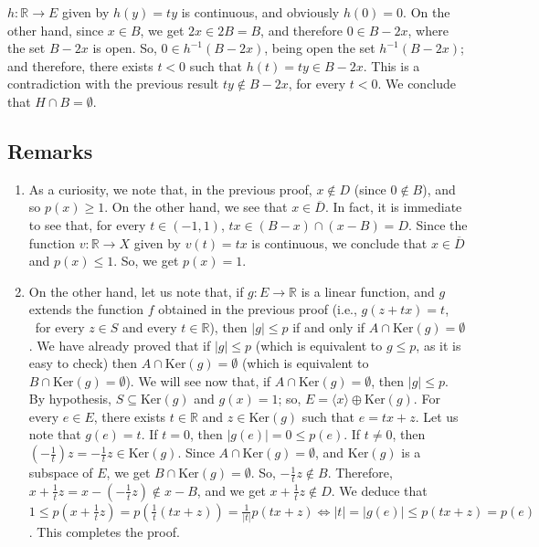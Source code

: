 \documentclass{article}
\begin{document}
$h:\mathbb{R}\rightarrow E$ given by $h(y)=ty$ is continuous, and obviously $h(0)=0$. On the other hand, since $x\in B$, we get $2x\in2B=B$, and therefore $0\in B-2x$, where the set $B-2x$ is open. So, $0\in h^{-1}(B-2x)$, being open the set $h^{-1}(B-2x)$; and therefore, there exists $t<0$ such that $h(t)=ty\in B-2x$. This is a contradiction with the previous result $ty\notin B-2x$, for every $t<0$. We conclude that $H\cap B=\emptyset$.

\subsection{Remarks}

\begin{enumerate}
\item As a curiosity, we note that, in the previous proof, $x\notin D$ (since $0\notin B$), and so $p(x)\geq1$. On the other hand, we see that $x\in\overline{D}$. In fact, it is immediate to see that, for every $t\in(-1,1)$, $tx\in(B-x)\cap(x-B)=D$. Since the function $v:\mathbb{R}\rightarrow X$ given by $v(t)=tx$ is continuous, we conclude that $x\in\overline{D}$ and $p(x)\leq1$. So, we get $p(x)=1$.

\item On the other hand, let us note that, if $g:E\rightarrow\mathbb{R}$ is a linear function, and $g$ extends the function $f$ obtained in the previous proof (i.e., $g(z+tx)=t$, \ for every $z\in S$ and every $t\in\mathbb{R}$), then $\vert g\vert\leq p$ if and only if $A\cap\text{Ker}(g)=\emptyset$. We have already proved that if $\vert g\vert\leq p$ (which is equivalent to $g\leq p$, as it is easy to check) then $A\cap\text{Ker}(g)=\emptyset$ (which is equivalent to $B\cap\text{Ker}(g)=\emptyset$). We will see now that, if $A\cap\text{Ker}(g)=\emptyset$, then $\vert g\vert \leq p$. By hypothesis, $S\subseteq\text{Ker}(g)$ and $g(x)=1$; so, $E=\langle x\rangle\oplus\text{Ker}(g)$. For every $e\in E$, there exists $t\in\mathbb{R}$ and $z\in\text{Ker}(g)$ such that $e=tx+z$. Let us note that $g(e)=t$. If $t=0$, then $\vert g(e)\vert=0\leq p(e)$. If $t\neq0$, then $(-\frac{1}{t})z=-\frac{1}{t}z\in\text{Ker}(g)$. Since $A\cap\text{Ker}(g)=\emptyset$, and $\text{Ker}(g)$ is a subspace of $E$, we get $B\cap\text{Ker}(g)=\emptyset$. So, $-\frac{1}{t}z\notin B$. Therefore, $x+\frac{1}{t}z=x-(-\frac{1}{t}z)\notin x-B$, and we get $x+\frac{1}{t}z\notin D$. We deduce that $1\leq p(x+\frac{1}{t}z)=p(\frac{1}{t}(tx+z))=\frac{1}{\vert t\vert}p(tx+z)\Leftrightarrow\vert t\vert=\vert g(e)\vert\leq p(tx+z)=p(e)$. This completes the proof.
\end{enumerate}
\end{document}
